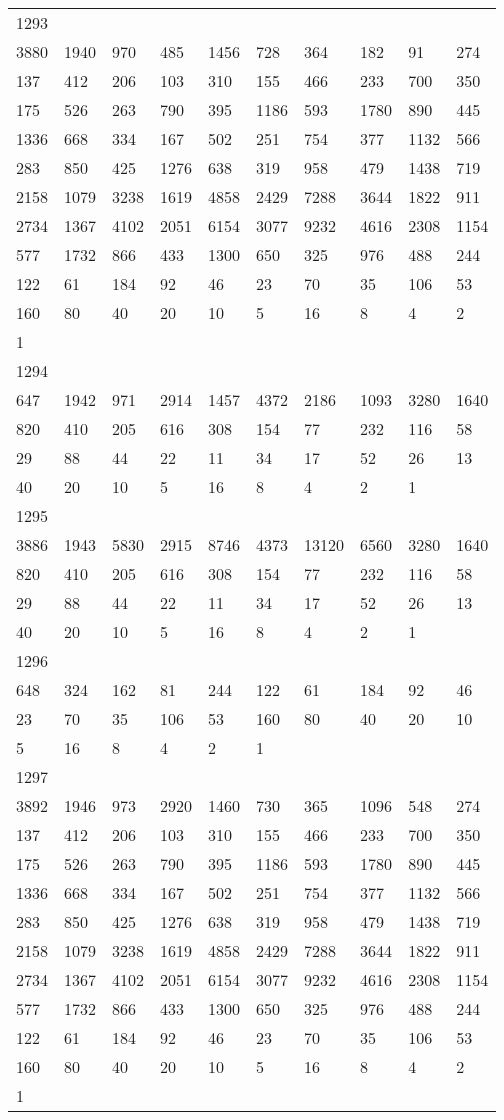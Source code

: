 \begin{longtable}{*{10}{l}}
1293&&&&&&&&&\\
3880& 1940& 970& 485& 1456& 728& 364& 182& 91& 274\\
137& 412& 206& 103& 310& 155& 466& 233& 700& 350\\
175& 526& 263& 790& 395& 1186& 593& 1780& 890& 445\\
1336& 668& 334& 167& 502& 251& 754& 377& 1132& 566\\
283& 850& 425& 1276& 638& 319& 958& 479& 1438& 719\\
2158& 1079& 3238& 1619& 4858& 2429& 7288& 3644& 1822& 911\\
2734& 1367& 4102& 2051& 6154& 3077& 9232& 4616& 2308& 1154\\
577& 1732& 866& 433& 1300& 650& 325& 976& 488& 244\\
122& 61& 184& 92& 46& 23& 70& 35& 106& 53\\
160& 80& 40& 20& 10& 5& 16& 8& 4& 2\\
1& \\

1294&&&&&&&&&\\
647& 1942& 971& 2914& 1457& 4372& 2186& 1093& 3280& 1640\\
820& 410& 205& 616& 308& 154& 77& 232& 116& 58\\
29& 88& 44& 22& 11& 34& 17& 52& 26& 13\\
40& 20& 10& 5& 16& 8& 4& 2& 1& \\

1295&&&&&&&&&\\
3886& 1943& 5830& 2915& 8746& 4373& 13120& 6560& 3280& 1640\\
820& 410& 205& 616& 308& 154& 77& 232& 116& 58\\
29& 88& 44& 22& 11& 34& 17& 52& 26& 13\\
40& 20& 10& 5& 16& 8& 4& 2& 1& \\

1296&&&&&&&&&\\
648& 324& 162& 81& 244& 122& 61& 184& 92& 46\\
23& 70& 35& 106& 53& 160& 80& 40& 20& 10\\
5& 16& 8& 4& 2& 1& \\

1297&&&&&&&&&\\
3892& 1946& 973& 2920& 1460& 730& 365& 1096& 548& 274\\
137& 412& 206& 103& 310& 155& 466& 233& 700& 350\\
175& 526& 263& 790& 395& 1186& 593& 1780& 890& 445\\
1336& 668& 334& 167& 502& 251& 754& 377& 1132& 566\\
283& 850& 425& 1276& 638& 319& 958& 479& 1438& 719\\
2158& 1079& 3238& 1619& 4858& 2429& 7288& 3644& 1822& 911\\
2734& 1367& 4102& 2051& 6154& 3077& 9232& 4616& 2308& 1154\\
577& 1732& 866& 433& 1300& 650& 325& 976& 488& 244\\
122& 61& 184& 92& 46& 23& 70& 35& 106& 53\\
160& 80& 40& 20& 10& 5& 16& 8& 4& 2\\
1& \\


\end{longtable}
